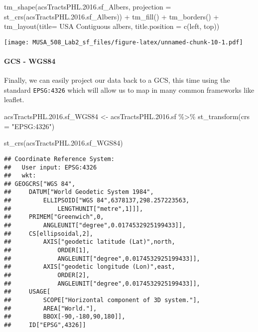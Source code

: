 \documentclass[
]{article}
\newenvironment{Shaded}{\begin{snugshade}}{\end{snugshade}}
\newcommand{\AttributeTok}[1]{\textcolor[rgb]{0.77,0.63,0.00}{#1}}
\newcommand{\FloatTok}[1]{\textcolor[rgb]{0.00,0.00,0.81}{#1}}
\newcommand{\FunctionTok}[1]{\textcolor[rgb]{0.00,0.00,0.00}{#1}}
\newcommand{\NormalTok}[1]{#1}
\newcommand{\OtherTok}[1]{\textcolor[rgb]{0.56,0.35,0.01}{#1}}
\newcommand{\SpecialCharTok}[1]{\textcolor[rgb]{0.00,0.00,0.00}{#1}}
\newcommand{\StringTok}[1]{\textcolor[rgb]{0.31,0.60,0.02}{#1}}
\begin{document}
\begin{Shaded}
\begin{Highlighting}[]
\FunctionTok{tm\_shape}\NormalTok{(acsTractsPHL.}\FloatTok{2016.}\NormalTok{sf\_Albers, }
         \AttributeTok{projection =} \FunctionTok{st\_crs}\NormalTok{(acsTractsPHL.}\FloatTok{2016.}\NormalTok{sf\_Albers)) }\SpecialCharTok{+}
  \FunctionTok{tm\_fill}\NormalTok{() }\SpecialCharTok{+}
  \FunctionTok{tm\_borders}\NormalTok{() }\SpecialCharTok{+}
  \FunctionTok{tm\_layout}\NormalTok{(}\AttributeTok{title=} \StringTok{\textquotesingle{}USA Contiguous albers\textquotesingle{}}\NormalTok{, }
            \AttributeTok{title.position =} \FunctionTok{c}\NormalTok{(}\StringTok{\textquotesingle{}left\textquotesingle{}}\NormalTok{, }\StringTok{\textquotesingle{}top\textquotesingle{}}\NormalTok{))}
\end{Highlighting}
\end{Shaded}

\texttt{[image: MUSA\_508\_Lab2\_sf\_files/figure-latex/unnamed-chunk-10-1.pdf]}

\hypertarget{gcs---wgs84}{%
\paragraph{GCS - WGS84}\label{gcs---wgs84}}

Finally, we can easily project our data back to a GCS, this time using
the standard \texttt{EPSG:4326} which will allow us to map in many
common frameworks like leaflet.

\begin{Shaded}
\begin{Highlighting}[]
\NormalTok{acsTractsPHL.}\FloatTok{2016.}\NormalTok{sf\_WGS84 }\OtherTok{\textless{}{-}}\NormalTok{ acsTractsPHL.}\FloatTok{2016.}\NormalTok{sf }\SpecialCharTok{\%\textgreater{}\%} 
  \FunctionTok{st\_transform}\NormalTok{(}\AttributeTok{crs =} \StringTok{"EPSG:4326"}\NormalTok{)}

\FunctionTok{st\_crs}\NormalTok{(acsTractsPHL.}\FloatTok{2016.}\NormalTok{sf\_WGS84)}
\end{Highlighting}
\end{Shaded}

\begin{verbatim}
## Coordinate Reference System:
##   User input: EPSG:4326 
##   wkt:
## GEOGCRS["WGS 84",
##     DATUM["World Geodetic System 1984",
##         ELLIPSOID["WGS 84",6378137,298.257223563,
##             LENGTHUNIT["metre",1]]],
##     PRIMEM["Greenwich",0,
##         ANGLEUNIT["degree",0.0174532925199433]],
##     CS[ellipsoidal,2],
##         AXIS["geodetic latitude (Lat)",north,
##             ORDER[1],
##             ANGLEUNIT["degree",0.0174532925199433]],
##         AXIS["geodetic longitude (Lon)",east,
##             ORDER[2],
##             ANGLEUNIT["degree",0.0174532925199433]],
##     USAGE[
##         SCOPE["Horizontal component of 3D system."],
##         AREA["World."],
##         BBOX[-90,-180,90,180]],
##     ID["EPSG",4326]]
\end{verbatim}
\end{document}
